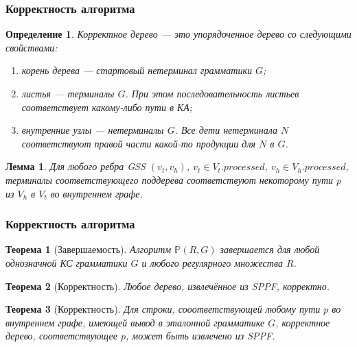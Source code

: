 \documentclass{beamer}
\newtheorem{rutheorem}{Теорема}
\newtheorem{rudefinition}{Определение}
\newtheorem{rulemma}{Лемма}
\begin{document}
\begin{frame}
    \transwipe[direction=90]
    \frametitle{Корректность алгоритма}
    \begin{rudefinition}
         \emph{Корректное дерево} --- это упорядоченное дерево со следующими свойствами:
        \begin{enumerate}
            \item корень дерева --- стартовый нетерминал грамматики $G$;
            \item листья ---  терминалы $G$. При этом последовательность листьев соответствует 
            какому-либо пути в КА;
            \item внутренние узлы --- нетерминалы $G$. Все дети нетерминала $N$ соответствуют правой части какой-то продукции для $N$ в $G$.
        \end{enumerate}
    \end{rudefinition}
    \begin{rulemma}
       Для любого ребра GSS $(v_{t}, v_{h})$, $v_{t} \in V_{t}.processed$, $v_{h} \in V_{h}.processed$, терминалы соответствующего поддерева соответствуют некоторому пути $p$ из $V_{h}$ в $V_{t}$ во внутреннем графе.
    \end{rulemma}

\end{frame}

\begin{frame}
    \transwipe[direction=90]
    \frametitle{Корректность алгоритма}
    \begin{rutheorem}[Завершаемость]
             Алгоритм $\mathbb{P}(R,G)$ завершается для любой однозначной КС грамматики $G$ и любого регулярного множества $R$.
    \end{rutheorem}

    \begin{rutheorem}[Корректность]
       Любое дерево, извлечённое из SPPF, корректно.
    \end{rutheorem}

    \begin{rutheorem}[Корректность]
      Для строки, сооответствующей любому пути $p$ во внутреннем графе, имеющей вывод в эталонной грамматике $G$, корректное дерево, соответствующее $p$, может быть извлечено из SPPF.
    \end{rutheorem}

\end{frame}
\end{document}
